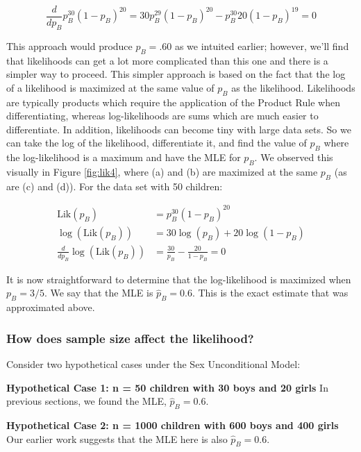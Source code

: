 \documentclass[
]{krantz}
\newcommand{\lik}{\mathrm{Lik}}
\begin{document}
\begin{equation*}
\frac{d}{dp_B}p_B^{30}(1-p_B)^{20} = 30p_B^{29}(1-p_B)^{20}-p^{30}_B20(1-p_B)^{19} = 0
\end{equation*}

This approach would produce \(p_B = .60\) as we intuited earlier; however, we'll find that likelihoods can get a lot more complicated than this one and there is a simpler way to proceed. This simpler approach is based on the fact that the log of a likelihood is maximized at the same value of \(p_B\) as the likelihood. Likelihoods are typically products which require the application of the Product Rule when differentiating, whereas log-likelihoods are sums which are much easier to differentiate. In addition, likelihoods can become tiny with large data sets. So we can take the log of the likelihood, differentiate it, and find the value of \(p_B\) where the log-likelihood is a maximum and have the MLE for \(p_B\). We observed this visually in Figure \ref{fig:lik4}, where (a) and (b) are maximized at the same \(p_B\) (as are (c) and (d)). For the data set with 50 children:

\begin{align*}
 \lik(p_B)                      &= p_B^{30}(1-p_B)^{20} \\
 \log(\lik(p_B))                &= 30\log(p_B)+20\log(1-p_B) \\
 \frac{d}{dp_B} \log(\lik(p_B)) &= \frac{30}{p_B} - \frac{20}{1-p_B} = 0
 \label{eq:dlogLik50}
\end{align*}

It is now straightforward to determine that the log-likelihood is maximized when \(p_B = 3/5.\) We say that the MLE is \(\hat{p}_B = 0.6\). This is the exact estimate that was approximated above.

\hypertarget{how-does-sample-size-affect-the-likelihood}{%
\subsubsection{How does sample size affect the likelihood?}\label{how-does-sample-size-affect-the-likelihood}}

Consider two hypothetical cases under the Sex Unconditional Model:

\textbf{Hypothetical Case 1: n = 50 children with 30 boys and 20 girls} In previous sections, we found the MLE, \(\hat{p}_B=0.6.\)

\textbf{Hypothetical Case 2: n = 1000 children with 600 boys and 400 girls} Our earlier work suggests that the MLE here is also \(\hat{p}_B=0.6.\)
\end{document}
